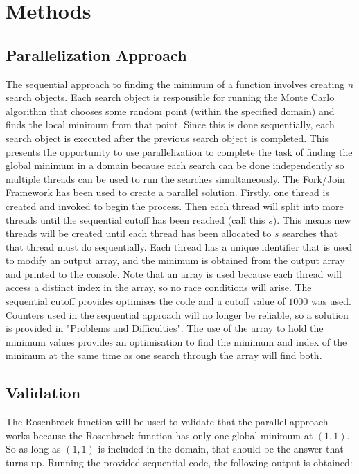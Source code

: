 \documentclass{assignment}
\begin{document}


\newpage

\section{Methods}
\subsection{Parallelization Approach}
The sequential approach to finding the minimum of a function involves creating $n$ search objects. Each search object is responsible for running the Monte Carlo algorithm that chooses some random point (within the specified domain) and finds the local minimum from that point. Since this is done sequentially, each search object is executed after the previous search object is completed. This presents the opportunity to use parallelization to complete the task of finding the global minimum in a domain because each search can be done independently so multiple threads can be used to run the searches simultaneously. 
The Fork/Join Framework has been used to create a parallel solution. Firstly, one thread is created and invoked to begin the process. Then each thread will split into more threads until the sequential cutoff has been reached (call this $s$). This means new threads will be created until each thread has been allocated to $s$ searches that that thread must do sequentially. Each thread has a unique identifier that is used to modify an output array, and the minimum is obtained from the output array and printed to the console. Note that an array is used because each thread will access a distinct index in the array, so no race conditions will arise. The sequential cutoff provides optimises the code and a cutoff value of $1000$ was used. Counters used in the sequential approach will no longer be reliable, so a solution is provided in "Problems and Difficulties". The use of the array to hold the minimum values provides an optimisation to find the minimum and index of the minimum at the same time as one search through the array will find both.
\subsection{Validation}
The Rosenbrock function will be used to validate that the parallel approach works because the Rosenbrock function has only one global minimum at $(1,1)$. So as long as $(1,1)$ is included in the domain, that should be the answer that turns up. Running the provided sequential code, the following output is obtained:
\begin{center}
     
\end{center}
\end{document}
